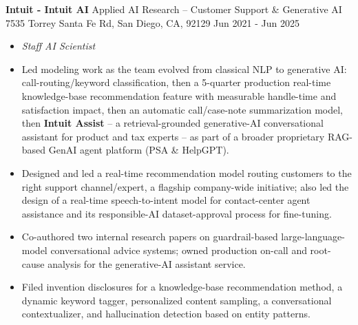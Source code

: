 \documentclass[10pt]{article}
\newenvironment{innerlist}[1][\enskip\textbullet]%
        {\begin{itemize}[#1,leftmargin=*,parsep=0pt,itemsep=0pt,topsep=0pt,partopsep=0pt]}
        {\end{itemize}}
\begin{document}
\textbf{Intuit - Intuit AI} \hfill{Applied AI Research -- Customer Support \& Generative AI}\\7535 Torrey Santa Fe Rd, San Diego, CA, 92129 \hfill {Jun 2021 - Jun 2025}
\begin{innerlist}
\item[] \emph{Staff AI Scientist}
   \item[--] Led modeling work as the team evolved from classical NLP to generative AI: call-routing/keyword classification, then a 5-quarter production real-time knowledge-base recommendation feature with measurable handle-time and satisfaction impact, then an automatic call/case-note summarization model, then \textbf{Intuit Assist} -- a retrieval-grounded generative-AI conversational assistant for product and tax experts -- as part of a broader proprietary RAG-based GenAI agent platform (PSA \& HelpGPT).
   \item[--] Designed and led a real-time recommendation model routing customers to the right support channel/expert, a flagship company-wide initiative; also led the design of a real-time speech-to-intent model for contact-center agent assistance and its responsible-AI dataset-approval process for fine-tuning.
   \item[--] Co-authored two internal research papers on guardrail-based large-language-model conversational advice systems; owned production on-call and root-cause analysis for the generative-AI assistant service.
   \item[--] Filed invention disclosures for a knowledge-base recommendation method, a dynamic keyword tagger, personalized content sampling, a conversational contextualizer, and hallucination detection based on entity patterns.
   \\
\end{innerlist}
\end{document}
